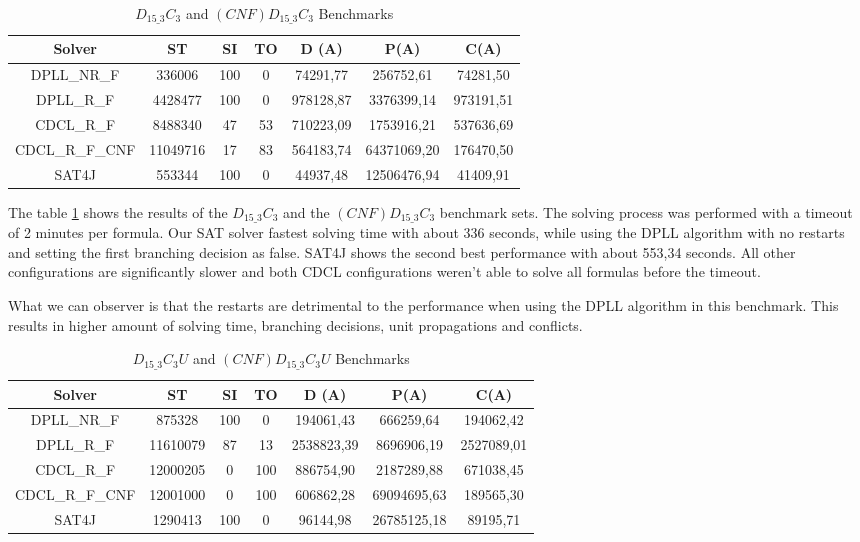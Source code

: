 \begin{table}[!htb]
\centering
\caption{$D_{15\_3}C_3$ and $(CNF)D_{15\_3}C_3$ Benchmarks}
\label{tab:dnfClauseBenchmarkSAT}
\begin{tabular}{|c|c|c|c|c|c|c|}
\hline
Solver & ST & SI & TO & D (A) & P(A) & C(A)\\
\hline
DPLL\_NR\_F & 336006 & 100 & 0 & 74291,77 & 256752,61 & 74281,50 \\
\hline
DPLL\_R\_F & 4428477 & 100 & 0 & 978128,87 & 3376399,14 & 973191,51 \\
\hline
CDCL\_R\_F & 8488340 & 47 & 53 & 710223,09 & 1753916,21 & 537636,69 \\
\hline
CDCL\_R\_F\_CNF & 11049716 & 17 & 83 & 564183,74 & 64371069,20 & 176470,50 \\
\hline
SAT4J & 553344 & 100 & 0 & 44937,48 & 12506476,94 & 41409,91 \\
\hline
\end{tabular}
\end{table}

The table \ref{tab:dnfClauseBenchmarkSAT} shows the results of the $D_{15\_3}C_3$ and the $(CNF)D_{15\_3}C_3$ benchmark sets. The solving process was performed with a timeout of 2 minutes per formula. Our SAT solver fastest solving time with about 336 seconds, while using the DPLL algorithm with no restarts and setting the first branching decision as false. SAT4J shows the second best performance with about 553,34 seconds. All other configurations are significantly slower and both CDCL configurations weren't able to solve all formulas before the timeout.

What we can observer is that the restarts are detrimental to the performance when using the DPLL algorithm in this benchmark. This results in higher amount of solving time, branching decisions, unit propagations and conflicts.

\begin{table}[!htb]
\centering
\caption{$D_{15\_3}C_3U$ and $(CNF)D_{15\_3}C_3U$ Benchmarks}
\label{tab:dnfClauseBenchmarkUNSAT}
\begin{tabular}{|c|c|c|c|c|c|c|}
\hline
Solver & ST & SI & TO & D (A) & P(A) & C(A)\\
\hline
DPLL\_NR\_F & 875328 & 100 & 0 & 194061,43 & 666259,64 & 194062,42 \\
\hline
DPLL\_R\_F & 11610079 & 87 & 13 & 2538823,39 & 8696906,19 & 2527089,01 \\
\hline
CDCL\_R\_F & 12000205 & 0 & 100 & 886754,90 & 2187289,88 & 671038,45 \\
\hline
CDCL\_R\_F\_CNF & 12001000 & 0 & 100 & 606862,28 & 69094695,63 & 189565,30 \\
\hline
SAT4J & 1290413 & 100 & 0 & 96144,98 & 26785125,18 & 89195,71 \\
\hline
\end{tabular}
\end{table}

